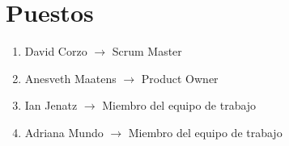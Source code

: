 \section{Puestos}
\begin{enumerate}
    \item David Corzo $\rightarrow$ Scrum Master
    \item Anesveth Maatens $\rightarrow$ Product Owner
    \item Ian Jenatz $\rightarrow$ Miembro del equipo de trabajo
    \item Adriana Mundo $\rightarrow$ Miembro del equipo de trabajo
\end{enumerate}
